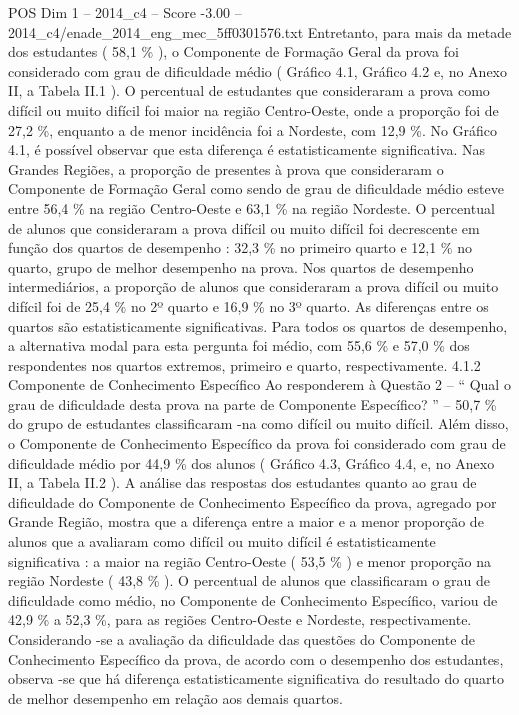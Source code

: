 \begin{textsample}{POS Dim 1 – 2014\_c4 – Score -3.00 – 2014\_c4/enade\_2014\_eng\_mec\_5ff0301576.txt}
Entretanto, para mais da metade dos estudantes ( 58,1 \% ), o Componente de Formação Geral da prova foi considerado com grau de dificuldade médio ( Gráfico 4.1, Gráfico 4.2 e, no Anexo II, a Tabela II.1 ).
O percentual de estudantes que consideraram a prova como difícil ou muito difícil foi maior na região Centro-Oeste, onde a proporção foi de 27,2 \%, enquanto a de menor incidência foi a Nordeste, com 12,9 \%.
No Gráfico 4.1, é possível observar que esta diferença é estatisticamente significativa.
Nas Grandes Regiões, a proporção de presentes à prova que consideraram o Componente de Formação Geral como sendo de grau de dificuldade médio esteve entre 56,4 \% na região Centro-Oeste e 63,1 \% na região Nordeste.
O percentual de alunos que consideraram a prova difícil ou muito difícil foi decrescente em função dos quartos de desempenho : 32,3 \% no primeiro quarto e 12,1 \% no quarto, grupo de melhor desempenho na prova.
Nos quartos de desempenho intermediários, a proporção de alunos que consideraram a prova difícil ou muito difícil foi de 25,4 \% no 2º quarto e 16,9 \% no 3º quarto.
As diferenças entre os quartos são estatisticamente significativas.
Para todos os quartos de desempenho, a alternativa modal para esta pergunta foi médio, com 55,6 \% e 57,0 \% dos respondentes nos quartos extremos, primeiro e quarto, respectivamente. 4.1.2 Componente de Conhecimento Específico Ao responderem à Questão 2 – “ Qual o grau de dificuldade desta prova na parte de Componente Específico? ” – 50,7 \% do grupo de estudantes classificaram -na como difícil ou muito difícil.
Além disso, o Componente de Conhecimento Específico da prova foi considerado com grau de dificuldade médio por 44,9 \% dos alunos ( Gráfico 4.3, Gráfico 4.4, e, no Anexo II, a Tabela II.2 ).
A análise das respostas dos estudantes quanto ao grau de dificuldade do Componente de Conhecimento Específico da prova, agregado por Grande Região, mostra que a diferença entre a maior e a menor proporção de alunos que a avaliaram como difícil ou muito difícil é estatisticamente significativa : a maior na região Centro-Oeste ( 53,5 \% ) e menor proporção na região Nordeste ( 43,8 \% ).
O percentual de alunos que classificaram o grau de dificuldade como médio, no Componente de Conhecimento Específico, variou de 42,9 \% a 52,3 \%, para as regiões Centro-Oeste e Nordeste, respectivamente.
Considerando -se a avaliação da dificuldade das questões do Componente de Conhecimento Específico da prova, de acordo com o desempenho dos estudantes, observa -se que há diferença estatisticamente significativa do resultado do quarto de melhor desempenho em relação aos demais quartos.

\end{textsample}
